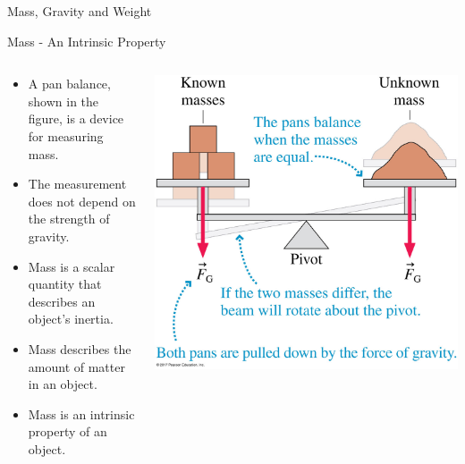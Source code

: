 \documentclass{beamer}
\begin{document}
\begin{frame}{Mass, Gravity and Weight}
\begin{center}
   \color{blue}{\Huge Mass, Gravity and Weight}
\end{center}
\end{frame}

\begin{frame}{Mass - An Intrinsic Property}
\begin{columns}
\begin{column}{0.5\textwidth}
\begin{itemize}
   \item A pan balance, shown in the figure, is a device for measuring mass.
   \item The measurement does not depend on the strength of gravity.
   \item Mass is a scalar quantity that describes an object's inertia.
   \item Mass describes the amount of matter in an object.
   \item Mass is an intrinsic property of an object.
\end{itemize}
\end{column}
\begin{column}{0.5\textwidth}
   \includegraphics[width=\textwidth]{../figures/06_05_Figure.jpg}
\end{column}
\end{columns}
\end{frame}
\end{document}
